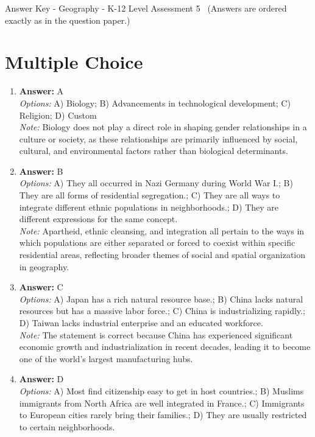 \documentclass[12pt]{article}
\begin{document}
\begin{center}
Answer Key - Geography - K-12 Level Assessment 5 \
\small (Answers are ordered exactly as in the question paper.)
\end{center}

\section*{Multiple Choice}
\begin{enumerate}[label=\arabic*.]
\item \textbf{Answer:} A
\\ \textit{Options:} A) Biology; B) Advancements in technological development; C) Religion; D) Custom
\\ \textit{Note:} Biology does not play a direct role in shaping gender relationships in a culture or society, as these relationships are primarily influenced by social, cultural, and environmental factors rather than biological determinants.
\item \textbf{Answer:} B
\\ \textit{Options:} A) They all occurred in Nazi Germany during World War I.; B) They are all forms of residential segregation.; C) They are all ways to integrate different ethnic populations in neighborhoods.; D) They are different expressions for the same concept.
\\ \textit{Note:} Apartheid, ethnic cleansing, and integration all pertain to the ways in which populations are either separated or forced to coexist within specific residential areas, reflecting broader themes of social and spatial organization in geography.
\item \textbf{Answer:} C
\\ \textit{Options:} A) Japan has a rich natural resource base.; B) China lacks natural resources but has a massive labor force.; C) China is industrializing rapidly.; D) Taiwan lacks industrial enterprise and an educated workforce.
\\ \textit{Note:} The statement is correct because China has experienced significant economic growth and industrialization in recent decades, leading it to become one of the world's largest manufacturing hubs.
\item \textbf{Answer:} D
\\ \textit{Options:} A) Most find citizenship easy to get in host countries.; B) Muslims immigrants from North Africa are well integrated in France.; C) Immigrants to European cities rarely bring their families.; D) They are usually restricted to certain neighborhoods.

\end{enumerate}
\end{document}
